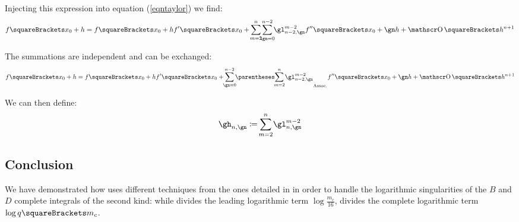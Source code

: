 \documentclass[10pt, a4paper, twoside]{basestyle}
\begin{document}
Injecting this expression into equation (\ref{eqntaylor}) we find:
\[
f\of{x_0 + h} = f\of{x_0} + h f\der\of{x_0} + \sum{m = 2}[n]{\sum{\gn = 0}[n - 2]{\gl^{m - 2}_{n - 2,\gn} f\dersecond\of{x_0 + \gn h}}} + \BigO\of{h^{n + 1}}
\]

The summations are independent and can be exchanged:
\[
f\of{x_0 + h} = f\of{x_0} + h f\der\of{x_0} + \sum{\gn = 0}[n - 2]{\pa{\sum{m = 2}[n]{\gl^{m - 2}_{n - 2,\gn}}} f\dersecond\of{x_0 + \gn h}} + \BigO\of{h^{n + 1}}
\]

We can then define:
\[
\gh_{n, \gn} \DefineAs \sum{m = 2}[n]{\gl^{m - 2}_{n,\gn}}
\]



\subsection*{Conclusion}
We have demonstrated how \cite{Fukushima2018} uses different techniques from the ones detailed in \cite{Fukushima2011a} in order to handle the 
logarithmic singularities of the $B$ and $D$ complete integrals of the second kind: while \cite{Fukushima2011a} divides the leading logarithmic term $\log \frac{m_c}{16}$, \cite{Fukushima2018} divides the complete logarithmic term $\log q\of{m_c}$.
\printbibliography
\end{document}
